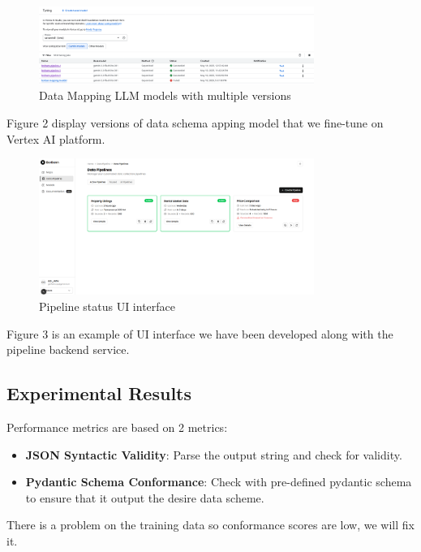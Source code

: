 \begin{figure}[H]
    \centering
    \includegraphics[width=0.8\textwidth]{assets/vertex/model-versioning.png}
    \caption{Data Mapping LLM models with multiple versions}
    \label{fig:model-versioning}
\end{figure}

Figure 2 display versions of data schema apping model that we fine-tune on Vertex AI platform.

\begin{figure}[H]
    \centering
    \includegraphics[width=0.8\textwidth]{assets/pipeline.png}
    \caption{Pipeline status UI interface}
    \label{fig:pipeline-status-ui}
\end{figure}

Figure 3 is an example of UI interface we have been developed along with the pipeline backend service.


\subsection{Experimental Results}

Performance metrics are based on 2 metrics:
        \begin{itemize}
            \item \textbf{JSON Syntactic Validity}: Parse the output string and check for validity.
            \item \textbf{Pydantic Schema Conformance}: Check with pre-defined pydantic schema to ensure that it output the desire data scheme.
        \end{itemize}

There is a problem on the training data so conformance scores are low, we will fix it.


